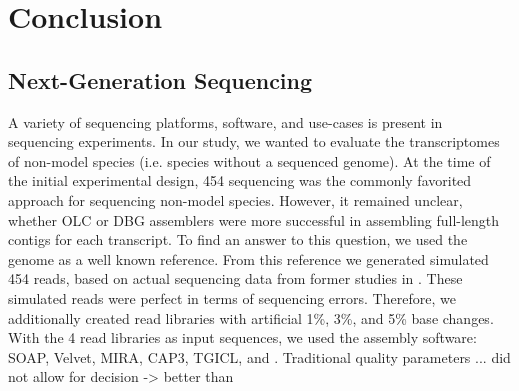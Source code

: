\chapter{Conclusion}
 \section{Next-Generation Sequencing}
	A variety of sequencing platforms, software, and use-cases is present in sequencing experiments.
	In our study, we wanted to evaluate the transcriptomes of non-model species (i.e. species without a sequenced genome).
	At the time of the initial experimental design, 454 sequencing was the commonly favorited approach for sequencing non-model species.
	However, it remained unclear, whether \ac{OLC} or \ac{DBG} assemblers were more successful in assembling full-length contigs for each transcript.
	To find an answer to this question, we used the  genome as a well known reference.
	From this reference we generated simulated 454 reads, based on actual sequencing data from former studies in  \cite{Braeutigam2010}.
	These simulated reads were perfect in terms of sequencing errors.
	Therefore, we additionally created read libraries with artificial 1\%, 3\%, and 5\% base changes.
	With the 4 read libraries as input sequences, we used the assembly software: SOAP\cite{unknown}, Velvet\cite{unknown}, MIRA\cite{unknown}, CAP3\cite{unknown}, TGICL\cite{unknown}, and \cite{CLC}.
	Traditional quality parameters ...  did not allow for decision -> better than 